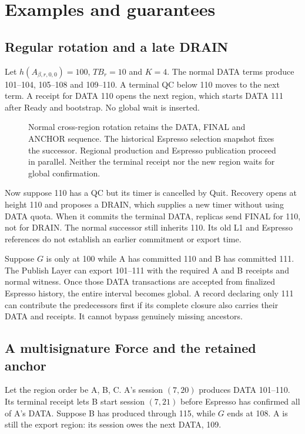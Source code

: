 \documentclass[11pt,a4paper]{article}
\newcommand{\TB}{\mathit{TB}}
\begin{document}
\section{Examples and guarantees}
\label{sec:examples}
\subsection{Regular rotation and a late DRAIN}
\label{sec:regular-example}
Let $h(A_{\beta,r,0,0})=100$, $\TB_r=10$ and $K=4$. The normal DATA terms
produce 101--104, 105--108 and 109--110. A terminal QC below 110 moves
to the next term. A receipt for DATA 110 opens the next region, which
starts DATA 111 after Ready and bootstrap. No global wait is inserted.

\begin{figure}[htbp]\centering

\caption{Normal cross-region rotation retains the DATA, FINAL and
ANCHOR sequence. The historical Espresso selection snapshot fixes the
successor. Regional production and Espresso publication proceed in
parallel. Neither the terminal receipt nor the new region waits for
global confirmation.}
\label{fig:regular-cross-region}
\end{figure}
\FloatBarrier

Now suppose 110 has a QC but its timer is cancelled by Quit.
Recovery opens at height 110 and proposes a DRAIN, which supplies a
new timer without using DATA quota. When it commits the terminal DATA,
replicas send FINAL for 110, not for DRAIN. The normal successor still
inherits 110. Its old L1 and Espresso references do not establish an
earlier commitment or export time.

Suppose $G$ is only at 100 while A has committed 110 and B has committed
111. The Publish Layer can export 101--111 with the required A and B receipts
and normal witness. Once those DATA transactions are accepted from finalized
Espresso history, the entire interval becomes global. A record declaring
only 111 can contribute the predecessors first if its complete closure
also carries their DATA and receipts. It cannot bypass genuinely missing
ancestors.

\subsection{A multisignature Force and the retained anchor}
\label{sec:force-example}
Let the region order be A, B, C. A's session $(7,20)$ produces
DATA 101--110. Its terminal receipt lets B start session $(7,21)$
before Espresso has confirmed all of A's DATA. Suppose B has produced
through 115, while $G$ ends at 108. A is still the export region:
its session owes the next DATA, 109.
\end{document}
